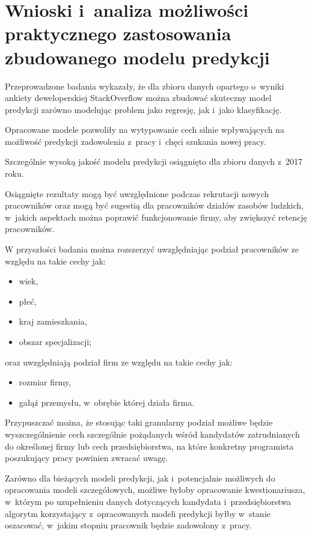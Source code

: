 \section{Wnioski i~analiza możliwości praktycznego zastosowania zbudowanego modelu predykcji}\label{sec:analysis:model-fitness}

Przeprowadzone badania wykazały, że dla zbioru danych opartego o~wyniki ankiety deweloperskiej StackOverflow \cite{so-survey-info}
można zbudować skuteczny model predykcji zarówno modelując problem jako regresję, jak i~jako klasyfikację.

Opracowane modele pozwoliły na wytypowanie cech silnie wpływających na możliwość predykcji zadowolenia z~pracy i~chęci szukania nowej pracy.

Szczególnie wysoką jakość modelu predykcji osiągnięto dla zbioru danych z~2017 roku.

Osiągnięte rezultaty mogą być uwzględnione podczas rekrutacji nowych pracowników
oraz mogą być sugestią dla pracowników działów zasobów ludzkich, w~jakich aspektach można poprawić funkcjonowanie firmy, aby zwiększyć retencję pracowników.

W przyszłości badania można rozszerzyć uwzględniając podział pracowników ze względu na takie cechy jak:

\begin{itemize}
    \item wiek,
    \item płeć,
    \item kraj zamieszkania,
    \item obszar specjalizacji;
\end{itemize}

oraz uwzględniają podział firm ze względu na takie cechy jak:

\begin{itemize}
    \item rozmiar firmy,
    \item gałąź przemysłu, w~obrębie której działa firma.
\end{itemize}

Przypuszczać można, że stosując taki granularny podział możliwe będzie wyszczególnienie cech szczególnie pożądanych wśród kandydatów zatrudnianych do określonej firmy
lub cech przedsiębiorstwa, na które konkretny programista poszukujący pracy powinien zwracać uwagę.

Zarówno dla bieżących modeli predykcji, jak i~potencjalnie możliwych do opracowania modeli szczegółowych,
możliwe byłoby opracowanie kwestionariusza, w~którym po uzupełnieniu danych dotyczących kandydata i~przedsiębiorstwa
algorytm korzystający z~opracowanych modeli predykcji byłby w~stanie oszacować, w~jakim stopniu pracownik będzie zadowolony z~pracy.

\thispagestyle{normal}
